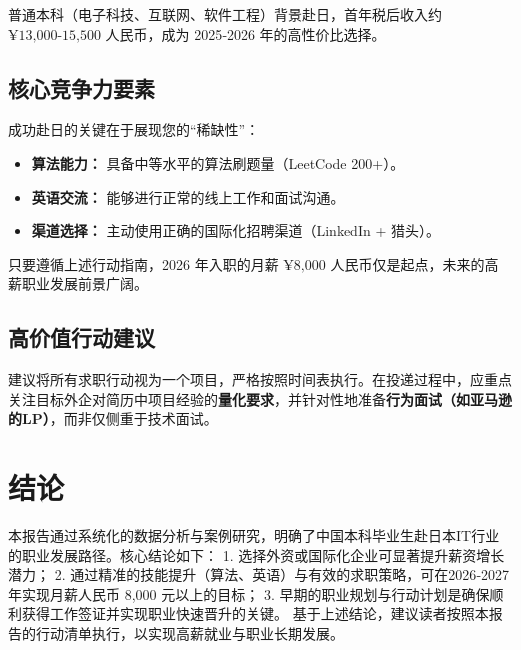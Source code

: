 \documentclass[12pt, a4paper]{ctexart}
\begin{document}
普通本科（电子科技、互联网、软件工程）背景赴日，首年税后收入约 $\text{¥13,000-15,500}$ 人民币，成为 2025‑2026 年的高性价比选择。

\subsection{核心竞争力要素}

成功赴日的关键在于展现您的“稀缺性”：

\begin{itemize}
    \item \textbf{算法能力：} 具备中等水平的算法刷题量（LeetCode 200+）。
    \item \textbf{英语交流：} 能够进行正常的线上工作和面试沟通。
    \item \textbf{渠道选择：} 主动使用正确的国际化招聘渠道（LinkedIn + 猎头）。
\end{itemize}

只要遵循上述行动指南，2026 年入职的月薪 $\text{¥8,000}$ 人民币仅是起点，未来的高薪职业发展前景广阔。

\subsection{高价值行动建议}

建议将所有求职行动视为一个项目，严格按照时间表执行。在投递过程中，应重点关注目标外企对简历中项目经验的\textbf{量化要求}，并针对性地准备\textbf{行为面试（如亚马逊的LP）}，而非仅侧重于技术面试。

\section{结论}
本报告通过系统化的数据分析与案例研究，明确了中国本科毕业生赴日本IT行业的职业发展路径。核心结论如下：
1. 选择外资或国际化企业可显著提升薪资增长潜力；
2. 通过精准的技能提升（算法、英语）与有效的求职策略，可在2026‑2027 年实现月薪人民币 8,000 元以上的目标；
3. 早期的职业规划与行动计划是确保顺利获得工作签证并实现职业快速晋升的关键。
基于上述结论，建议读者按照本报告的行动清单执行，以实现高薪就业与职业长期发展。

\end{document}
